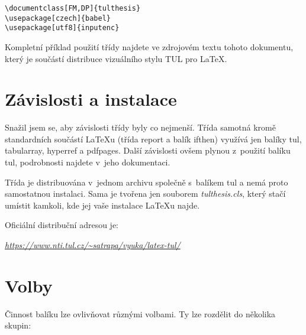 \documentclass[fonts,numbering,twoside,margins]{./tulpackage/tulthesis}
\newcommand{\argument}[1]{{\ttfamily\color{\tulcolor}#1}}
\newenvironment{myquote}{\begin{list}{}{\setlength\leftmargin\parindent}\item[]}{\end{list}}
\newenvironment{listing}{\begin{myquote}\color{\tulcolor}}{\end{myquote}}
\begin{document}
\begin{listing}
\begin{verbatim}
\documentclass[FM,DP]{tulthesis}
\usepackage[czech]{babel}
\usepackage[utf8]{inputenc}
\end{verbatim}
\end{listing}

Kompletní příklad použití třídy najdete ve zdrojovém textu tohoto dokumentu,
který je součástí distribuce vizuálního stylu TUL pro \LaTeX.


\chapter{Závislosti a instalace}

Snažil jsem se, aby závislosti třídy byly co nejmenší. Třída samotná kromě
standardních součástí \LaTeX u (třída \argument{report} a balík
\argument{ifthen}) využívá jen balíky \argument{tul}, \argument{tabularray},
\argument{hyperref} a \argument{pdfpages}. Další závislosti ovšem plynou
z~použití balíku \argument{tul}, podrobnosti najdete v~jeho dokumentaci.

Třída je distribuována v~jednom archivu společně s~balíkem \argument{tul} a
nemá proto samostatnou instalaci. Sama je tvořena jen souborem
\emph{tulthesis.cls}, který stačí umístit kamkoli, kde jej vaše instalace
\LaTeX u najde. 

Oficiální distribuční adresou je:

\begin{listing}
\href{https://www.nti.tul.cz/~satrapa/vyuka/latex-tul/}{\emph{https://www.nti.tul.cz/\textasciitilde satrapa/vyuka/latex-tul/}}
\end{listing}


\chapter{Volby}\label{volby}

Činnost balíku lze ovlivňovat různými volbami. Ty lze rozdělit do několika
skupin:
\end{document}

